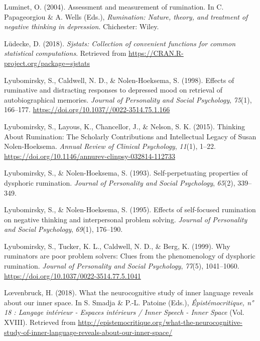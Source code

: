 \documentclass[a4paper,12pt,twoside,onecolumn,openright,final,oldfontcommands]{memoir}
\begin{document}
\leavevmode\hypertarget{ref-luminet_assessment_2004}{}%
Luminet, O. (2004). Assessment and measurement of rumination. In C. Papageorgiou \& A. Wells (Eds.), \emph{Rumination: Nature, theory, and treatment of negative thinking in depression}. Chichester: Wiley.

\leavevmode\hypertarget{ref-R-sjstats}{}%
Lüdecke, D. (2018). \emph{Sjstats: Collection of convenient functions for common statistical computations}. Retrieved from \url{https://CRAN.R-project.org/package=sjstats}

\leavevmode\hypertarget{ref-Lyubomirsky1998}{}%
Lyubomirsky, S., Caldwell, N. D., \& Nolen-Hoeksema, S. (1998). Effects of ruminative and distracting responses to depressed mood on retrieval of autobiographical memories. \emph{Journal of Personality and Social Psychology}, \emph{75}(1), 166--177. \url{https://doi.org/10.1037//0022-3514.75.1.166}

\leavevmode\hypertarget{ref-lyubomirsky_thinking_2015}{}%
Lyubomirsky, S., Layous, K., Chancellor, J., \& Nelson, S. K. (2015). Thinking About Rumination: The Scholarly Contributions and Intellectual Legacy of Susan Nolen-Hoeksema. \emph{Annual Review of Clinical Psychology}, \emph{11}(1), 1--22. \url{https://doi.org/10.1146/annurev-clinpsy-032814-112733}

\leavevmode\hypertarget{ref-lyubomirsky_self-perpetuating_1993}{}%
Lyubomirsky, S., \& Nolen-Hoeksema, S. (1993). Self-perpetuating properties of dysphoric rumination. \emph{Journal of Personality and Social Psychology}, \emph{65}(2), 339--349.

\leavevmode\hypertarget{ref-lyubomirsky_effects_1995}{}%
Lyubomirsky, S., \& Nolen-Hoeksema, S. (1995). Effects of self-focused rumination on negative thinking and interpersonal problem solving. \emph{Journal of Personality and Social Psychology}, \emph{69}(1), 176--190.

\leavevmode\hypertarget{ref-lyubomirsky_why_1999}{}%
Lyubomirsky, S., Tucker, K. L., Caldwell, N. D., \& Berg, K. (1999). Why ruminators are poor problem solvers: Clues from the phenomenology of dysphoric rumination. \emph{Journal of Personality and Social Psychology}, \emph{77}(5), 1041--1060. \url{https://doi.org/10.1037/0022-3514.77.5.1041}

\leavevmode\hypertarget{ref-loevenbruck_what_2018}{}%
Lœvenbruck, H. (2018). What the neurocognitive study of inner language reveals about our inner space. In S. Smadja \& P.-L. Patoine (Eds.), \emph{Épistémocritique, n° 18 : Langage intérieur - Espaces intérieurs / Inner Speech - Inner Space} (Vol. XVIII). Retrieved from \url{http://epistemocritique.org/what-the-neurocognitive-study-of-inner-language-reveals-about-our-inner-space/}
\end{document}
